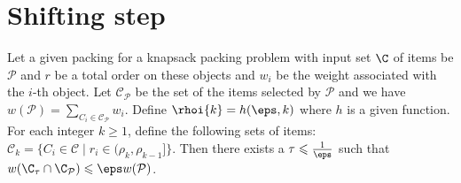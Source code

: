 \section{Shifting step}\label{sec:shifting}
\begin{lem}
	\label{lem:shifting}
	Let a given packing for a knapsack packing problem with input set \(\C\) of items be $\mathcal{P}$ and \(r\) be a total order on these objects and \(w_i\) be the weight associated with the \(i\)-th object. Let $\mathcal{C}_{\mathcal{P}}$ be the set of the items selected by $\mathcal{P}$ and we have $w(\mathcal{P}) = \sum_{C_{i}\in \mathcal{C}_{\mathcal{P}}} w_{i}$. Define $\rhoi{k} = h(\eps, k)$ where \(h\) is a given function. For each integer \(k\geqslant 1\), define the following sets of items:
	\(
	\mathcal{C}_k = \{C_i \in \mathcal{C} \mid r_{i} \in (\rho_{k},\rho_{k-1}]\}.
	\)
	Then there exists a \(\tau \leqslant \frac{1}{\eps}\) such that \(w(\C_{\tau}\cap\C_{\mathcal{P}})\leqslant\eps w(\mathcal{P})\).
\end{lem}
